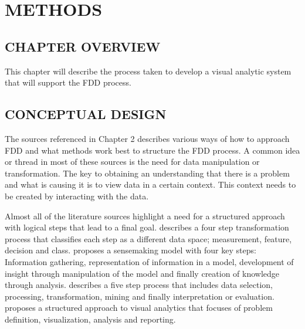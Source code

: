 
\chapter{METHODS}

\section{CHAPTER OVERVIEW}

This chapter will describe the process taken to develop a visual analytic system that will support the FDD process.

\section{CONCEPTUAL DESIGN}

The sources referenced in Chapter 2 describes various ways of how to approach FDD and what methods work best to structure the FDD process. A common idea or thread in most of these sources is the need for data manipulation or transformation. The key to obtaining an understanding that there is a problem and what is causing it is to  view data in a certain context. This context needs to be created by interacting with the data. 

Almost all of the literature sources highlight a need for a structured approach with logical steps that lead to a final goal. \cite{venkatasubramanian2003review} describes a four step transformation process that classifies each step as a different data space; measurement, feature, decision and class. \cite{pirolli2005sensemaking} proposes a sensemaking model with four key steps: Information gathering, representation of information in a model, development of insight through manipulation of the model and finally creation of knowledge through analysis. \cite{fayyad1996data} describes a five step process that includes data selection, processing, transformation, mining and finally interpretation or evaluation. \cite{mahyar2010closer} proposes a structured approach to visual analytics that focuses of problem definition, visualization, analysis and reporting.


